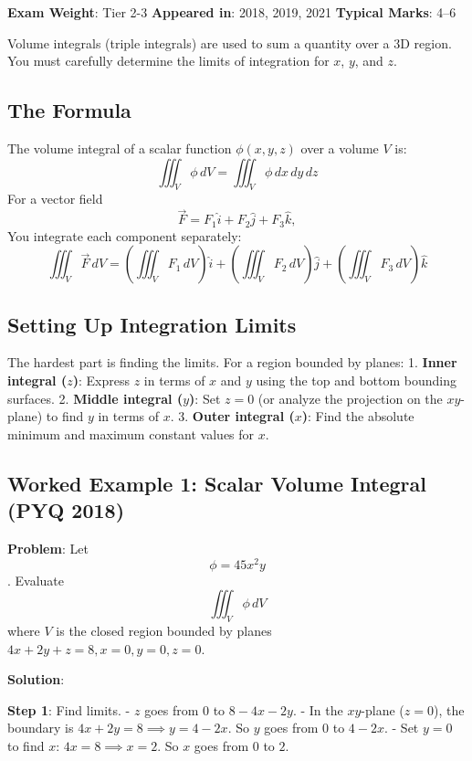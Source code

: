 \documentclass[
]{article}
\renewenvironment{quote}
  {\begin{tcolorbox}[
     colback=calloutbg,
     colframe=calloutframe,
     colupper=callouttext,
     arc=3pt,
     boxrule=0.5pt,
     leftrule=0.5pt,
     borderline west={3pt}{0pt}{calloutaccent},
     left=8pt,
     right=8pt,
     top=6pt,
     bottom=6pt
   ]}
  {\end{tcolorbox}}
\begin{document}
\begin{quote}
\textbf{Exam Weight}: Tier 2-3 \textbar{} \textbf{Appeared in}: 2018,
2019, 2021 \textbar{} \textbf{Typical Marks}: 4--6
\end{quote}

Volume integrals (triple integrals) are used to sum a quantity over a 3D
region. You must carefully determine the limits of integration for
\(x\), \(y\), and \(z\).

\subsection{The Formula}\label{the-formula-1}

The volume integral of a scalar function \(\phi(x,y,z)\) over a volume
\(V\) is:
\[
\iiint_V \phi \, dV = \iiint_V \phi \, dx \, dy \, dz
\]
For a vector field
\[
\vec{F} = F_1\hat{i} + F_2\hat{j} + F_3\hat{k},
\]
You integrate each component separately:
\[
\iiint_V \vec{F} \, dV = \left(\iiint_V F_1 \, dV\right)\hat{i} + \left(\iiint_V F_2 \, dV\right)\hat{j} + \left(\iiint_V F_3 \, dV\right)\hat{k}
\]

\subsection{Setting Up Integration
Limits}\label{setting-up-integration-limits}

The hardest part is finding the limits. For a region bounded by planes:
1. \textbf{Inner integral (\(z\))}: Express \(z\) in terms of \(x\) and
\(y\) using the top and bottom bounding surfaces. 2. \textbf{Middle
integral (\(y\))}: Set \(z=0\) (or analyze the projection on the
\(xy\)-plane) to find \(y\) in terms of \(x\). 3. \textbf{Outer integral
(\(x\))}: Find the absolute minimum and maximum constant values for
\(x\).

\subsection{Worked Example 1: Scalar Volume Integral (PYQ
2018)}\label{worked-example-1-scalar-volume-integral-pyq-2018}

\textbf{Problem}: Let
\[
\phi = 45x^2y
\]
. Evaluate
\[
\iiint_V \phi \, dV
\]
where \(V\) is the closed region bounded by planes
\(4x + 2y + z = 8, x = 0, y = 0, z = 0\).

\textbf{Solution}:

\textbf{Step 1}: Find limits. - \(z\) goes from \(0\) to
\(8 - 4x - 2y\). - In the \(xy\)-plane (\(z=0\)), the boundary is
\(4x + 2y = 8 \implies y = 4 - 2x\). So \(y\) goes from \(0\) to
\(4 - 2x\). - Set \(y=0\) to find \(x\): \(4x = 8 \implies x = 2\). So
\(x\) goes from \(0\) to \(2\).
\end{document}
